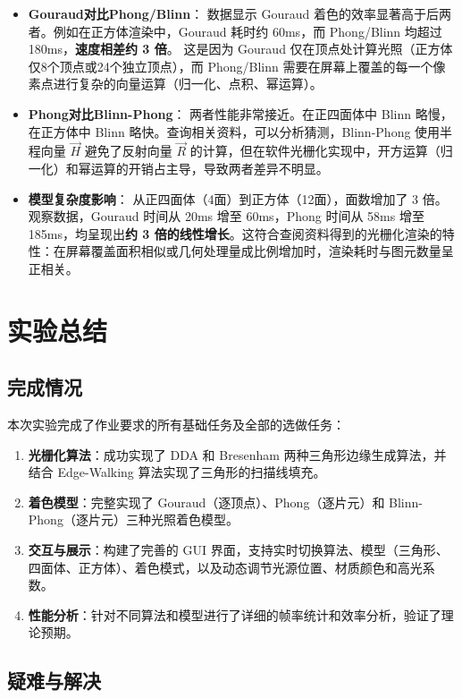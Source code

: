 \documentclass[a4paper]{article}
\begin{document}
\begin{itemize}
    \item \textbf{Gouraud对比Phong/Blinn}：
    数据显示 Gouraud 着色的效率显著高于后两者。例如在正方体渲染中，Gouraud 耗时约 60ms，而 Phong/Blinn 均超过 180ms，\textbf{速度相差约 3 倍}。
    这是因为 Gouraud 仅在顶点处计算光照（正方体仅8个顶点或24个独立顶点），而 Phong/Blinn 需要在屏幕上覆盖的每一个像素点进行复杂的向量运算（归一化、点积、幂运算）。

    \item \textbf{Phong对比Blinn-Phong}：
    两者性能非常接近。在正四面体中 Blinn 略慢，在正方体中 Blinn 略快。查询相关资料，可以分析猜测，Blinn-Phong 使用半程向量 $\vec{H}$ 避免了反射向量 $\vec{R}$ 的计算，但在软件光栅化实现中，开方运算（归一化）和幂运算的开销占主导，导致两者差异不明显。

    \item \textbf{模型复杂度影响}：
    从正四面体（4面）到正方体（12面），面数增加了 3 倍。观察数据，Gouraud 时间从 20ms 增至 60ms，Phong 时间从 58ms 增至 185ms，均呈现出\textbf{约 3 倍的线性增长}。这符合查阅资料得到的光栅化渲染的特性：在屏幕覆盖面积相似或几何处理量成比例增加时，渲染耗时与图元数量呈正相关。
\end{itemize}

\section{实验总结}

\subsection{完成情况}
本次实验完成了作业要求的所有基础任务及全部的选做任务：
\begin{enumerate}
    \item \textbf{光栅化算法}：成功实现了 DDA 和 Bresenham 两种三角形边缘生成算法，并结合 Edge-Walking 算法实现了三角形的扫描线填充。
    \item \textbf{着色模型}：完整实现了 Gouraud（逐顶点）、Phong（逐片元）和 Blinn-Phong（逐片元）三种光照着色模型。
    \item \textbf{交互与展示}：构建了完善的 GUI 界面，支持实时切换算法、模型（三角形、四面体、正方体）、着色模式，以及动态调节光源位置、材质颜色和高光系数。
    \item \textbf{性能分析}：针对不同算法和模型进行了详细的帧率统计和效率分析，验证了理论预期。
\end{enumerate}

\subsection{疑难与解决}
\end{document}
